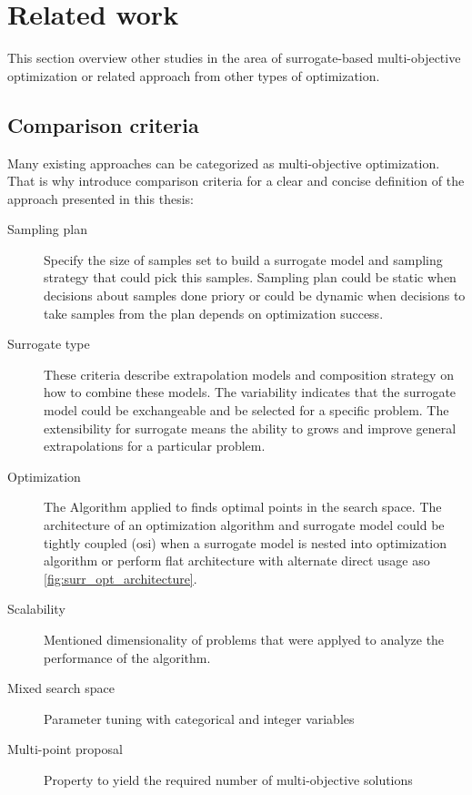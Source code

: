 \chapter{Related work}\label{sec:related}

    This section overview other studies in the area of surrogate-based multi-objective optimization or related approach from other types of optimization.


    \section{Comparison criteria}
        Many existing approaches can be categorized as multi-objective optimization. That is why introduce comparison criteria for a clear and concise definition of the approach presented in this thesis:
        \begin{description}
            \item[Sampling plan] Specify the size of samples set to build a surrogate model and sampling strategy that could pick this samples. Sampling plan could be static when decisions about samples done priory or could be dynamic when decisions to take samples from the plan depends on optimization success.
            \item[Surrogate type] These criteria describe extrapolation models and composition strategy on how to combine these models. The variability indicates that the surrogate model could be exchangeable and be selected for a specific problem. The extensibility for surrogate means the ability to grows and improve general extrapolations for a particular problem.
            \item[Optimization] The Algorithm applied to finds optimal points in the search space. The architecture of an optimization algorithm and surrogate model could be tightly coupled (\gls{osi}) when a surrogate model is nested into optimization algorithm or perform flat architecture with alternate direct usage \gls{aso} \ref{fig:surr_opt_architecture}.
            \item[Scalability] Mentioned dimensionality of problems that were applyed to analyze the performance of the algorithm.
            \item[Mixed search space] Parameter tuning with categorical and integer variables
            \item[Multi-point proposal] Property to yield the required number of multi-objective solutions 
        \end{description}

